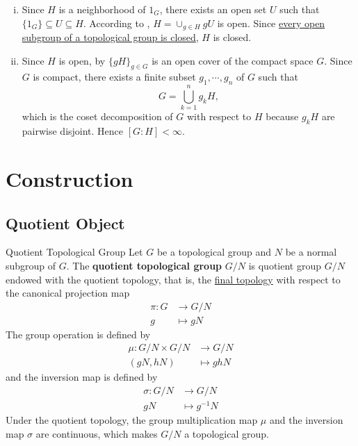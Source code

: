 \documentclass{report}
\begin{document}
\begin{prf}
	\begin{enumerate}[(i)]
		\item Since $H$ is a neighborhood of $1_G$, there exists an open set $U$ such that $\{1_G\}\subseteq U\subseteq H$. According to , $H=\cup_{g\in H}gU$ is open. Since \hyperref[th:open_subgroup_is_closed]{every open subgroup of a topological group is closed}, $H$ is closed.
		\item Since $H$ is open, by  $\{gH\}_{g\in G}$ is an open cover of the compact space $G$. Since $G$ is compact, there exists a finite subset ${g_1,\cdots,g_n}$ of $G$ such that 
		\[
		G=\bigcup_{k=1}^n g_kH,
		\]
		which is the coset decomposition of $G$ with respect to $H$ because $g_kH$ are pairwise disjoint. Hence $[G:H]<\infty$.
	\end{enumerate}
\end{prf}

\section{Construction}

\subsection{Quotient Object}
\begin{definition}{Quotient Topological Group}{}
	Let $G$ be a topological group and $N$ be a normal subgroup of $G$. The \textbf{quotient topological group} $G/N$ is quotient group $G/N$ endowed with the quotient topology, that is, the \hyperref[th:final_topology]{final topology} with respect to the canonical projection map
	\begin{align*}
		\pi:G & \longrightarrow G/N \\
		g     & \longmapsto gN
	\end{align*}
	The group operation is  defined by
	\begin{align*}
		\mu:G/N\times G/N & \longrightarrow G/N \\
		(gN,hN)           & \longmapsto ghN
	\end{align*}
	and the inversion map is defined by
	\begin{align*}
		\sigma:G/N & \longrightarrow G/N \\
		gN         & \longmapsto g^{-1}N
	\end{align*}
	Under the quotient topology, the group multiplication map $\mu$ and the inversion map $\sigma$ are continuous, which makes $G/N$ a topological group.
\end{definition}
\end{document}
